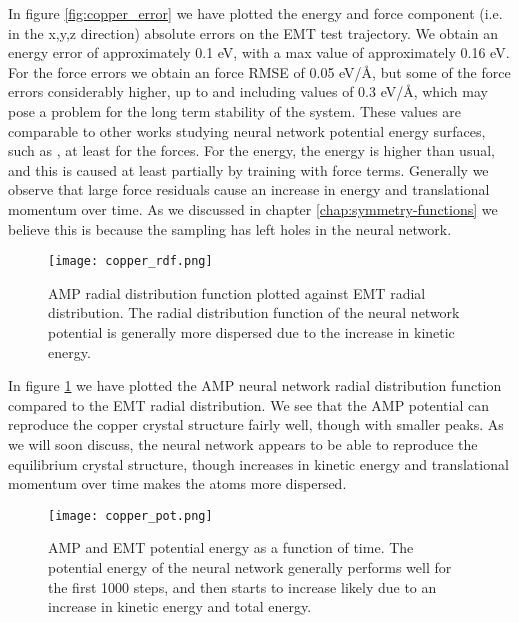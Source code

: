In figure \ref{fig:copper_error} we have plotted the energy and force component
(i.e. in the x,y,z direction)
absolute errors on the EMT test trajectory. We obtain an energy error
of approximately 0.1 eV, with a max value of approximately 0.16 eV.
For the force errors we obtain an force RMSE of 0.05 eV/Å,
but some of the force errors considerably higher, up to
and including values of 0.3 eV/Å, which may pose
a problem for the long term stability of the system.
These values are comparable to other works studying neural network
potential energy surfaces, such as \cite{stende2017constructing,
treider2017speeding, khorshidi2016amp, PhysRevLett.120.143001},
at least for the forces. For the energy, the energy is higher than usual, and
this is caused at least partially by training with force terms.
Generally we observe that large force residuals cause an increase
in energy and translational momentum over time. As we discussed
in chapter \ref{chap:symmetry-functions} we believe this is because
the sampling has left holes in the neural network.

\begin{figure}[H]
    \centering
    \texttt{[image: copper\_rdf.png]}
    \caption{AMP radial distribution function plotted against
        EMT radial distribution.
        The radial distribution function of the neural network potential is
        generally more dispersed due to the increase in kinetic energy.}
    \label{fig:copper-rdf}
\end{figure}

In figure \ref{fig:copper-rdf} we have plotted the AMP neural network
radial distribution function compared to the EMT radial distribution.
We see that the AMP potential can reproduce the copper crystal
structure fairly well, though with smaller peaks.
As we will soon discuss, the neural network appears
to be able to reproduce the equilibrium crystal structure,
though increases in kinetic energy and translational momentum over time
makes the atoms more dispersed.

\begin{figure}[H]
    \centering
    \texttt{[image: copper\_pot.png]}
    \caption{AMP and EMT potential energy as a function of time.
        The potential energy of the neural network generally performs well
        for the first 1000 steps, and then starts to increase
        likely due to an increase in kinetic energy and total energy.}
    \label{fig:copper-pot}
\end{figure}

